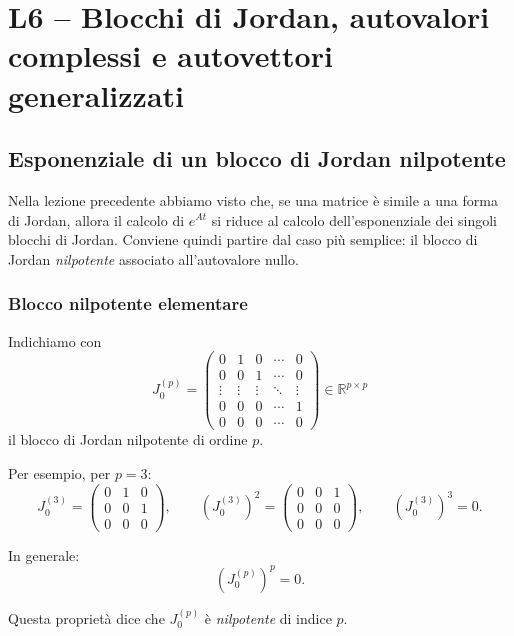 \chapter{L6 -- Blocchi di Jordan, autovalori complessi e autovettori generalizzati}

\section{Esponenziale di un blocco di Jordan nilpotente}

Nella lezione precedente abbiamo visto che, se una matrice è simile a una forma di Jordan, allora il calcolo di $e^{At}$ si riduce al calcolo dell'esponenziale dei singoli blocchi di Jordan.  
Conviene quindi partire dal caso più semplice: il blocco di Jordan \emph{nilpotente} associato all'autovalore nullo.

\subsection{Blocco nilpotente elementare}

Indichiamo con
\[
J_0^{(p)}=
\begin{pmatrix}
0 & 1 & 0 & \cdots & 0\\
0 & 0 & 1 & \cdots & 0\\
\vdots & \vdots & \vdots & \ddots & \vdots\\
0 & 0 & 0 & \cdots & 1\\
0 & 0 & 0 & \cdots & 0
\end{pmatrix}\in\mathbb{R}^{p\times p}
\]
il blocco di Jordan nilpotente di ordine $p$.

Per esempio, per $p=3$:
\[
J_0^{(3)}=
\begin{pmatrix}
0 & 1 & 0\\
0 & 0 & 1\\
0 & 0 & 0
\end{pmatrix},
\qquad
\left(J_0^{(3)}\right)^2=
\begin{pmatrix}
0 & 0 & 1\\
0 & 0 & 0\\
0 & 0 & 0
\end{pmatrix},
\qquad
\left(J_0^{(3)}\right)^3=0.
\]

In generale:
\begin{equation}
\left(J_0^{(p)}\right)^p=0.
\label{eq:L6_nilpotent_power_zero}
\end{equation}

Questa proprietà dice che $J_0^{(p)}$ è \emph{nilpotente} di indice $p$.

